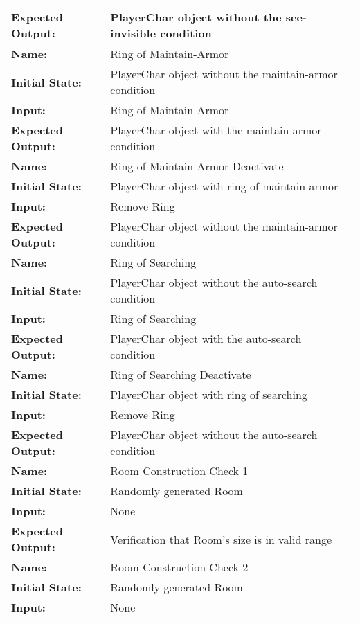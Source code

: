 \documentclass[12pt, titlepage]{article}
\begin{document}
\begin{center}
\begin{longtable}{ l | p{10cm} }
				\textbf{Expected Output:} & PlayerChar object without the see-invisible condition\\[0.6em]
				\hline
				\rule{0pt}{1.5em}\textbf{Name:} & Ring of Maintain-Armor\\
				\textbf{Initial State:} & PlayerChar object without the maintain-armor condition\\
				\textbf{Input:} & Ring of Maintain-Armor\\
				\textbf{Expected Output:} & PlayerChar object with the maintain-armor condition\\[0.6em]
				\hline
				\rule{0pt}{1.5em}\textbf{Name:} & Ring of Maintain-Armor Deactivate\\
				\textbf{Initial State:} & PlayerChar object with ring of maintain-armor\\
				\textbf{Input:} & Remove Ring\\
				\textbf{Expected Output:} & PlayerChar object without the maintain-armor condition\\[0.6em]
				\hline
				\rule{0pt}{1.5em}\textbf{Name:} & Ring of Searching\\
				\textbf{Initial State:} & PlayerChar object without the auto-search condition\\
				\textbf{Input:} & Ring of Searching\\
				\textbf{Expected Output:} & PlayerChar object with the auto-search condition\\[0.6em]
				\hline
				\rule{0pt}{1.5em}\textbf{Name:} & Ring of Searching Deactivate\\
				\textbf{Initial State:} & PlayerChar object with ring of searching\\
				\textbf{Input:} & Remove Ring\\
				\textbf{Expected Output:} & PlayerChar object without the auto-search condition\\[0.6em]
				\hline
				\rule{0pt}{1.5em}\textbf{Name:} & Room Construction Check 1\\
				\textbf{Initial State:} & Randomly generated Room\\
				\textbf{Input:} & None\\
				\textbf{Expected Output:} & Verification that Room's size is in valid range\\[0.6em]
				\hline
				\rule{0pt}{1.5em}\textbf{Name:} & Room Construction Check 2\\
				\textbf{Initial State:} & Randomly generated Room\\
				\textbf{Input:} & None\\

\end{longtable}
\end{center}
\end{document}
